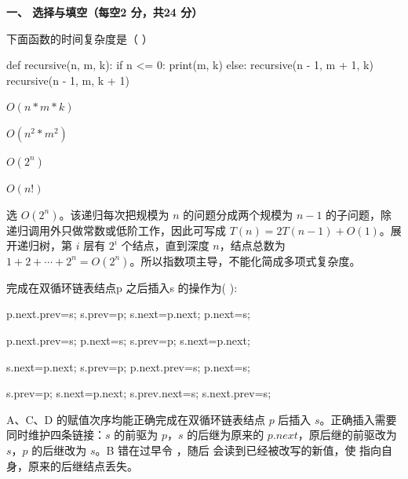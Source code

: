 

\textbf{一、 选择与填空（每空2 分，共24 分）}
\begin{question}
下面函数的时间复杂度是（    ）\\
\begin{pycode}
def recursive(n, m, k):
    if n <= 0:
        print(m, k)
    else:
        recursive(n - 1, m + 1, k)
        recursive(n - 1, m, k + 1)
\end{pycode}
\begin{choiceoptions}[2]
  \item $O(n*m*k)$
  \item $O(n^2*m^2)$
  \item $O(2^n)$
  \item $O(n!)$
\end{choiceoptions}
\begin{solution}
选 $O(2^n)$。该递归每次把规模为 $n$ 的问题分成两个规模为 $n-1$ 的子问题，除递归调用外只做常数或低阶工作，因此可写成 $T(n)=2T(n-1)+O(1)$。展开递归树，第 $i$ 层有 $2^i$ 个结点，直到深度 $n$，结点总数为 $1+2+\cdots+2^n=O(2^n)$。所以指数项主导，不能化简成多项式复杂度。
\end{solution}
\end{question}

\begin{question}
完成在双循环链表结点p 之后插入s 的操作为(       ):\\
\begin{choiceoptions}[2]
  \item p.next.prev=s; s.prev=p; s.next=p.next; p.next=s;
  \item p.next.prev=s; p.next=s; s.prev=p; s.next=p.next;
  \item s.next=p.next; s.prev=p; p.next.prev=s; p.next=s;
  \item s.prev=p; s.next=p.next; s.prev.next=s; s.next.prev=s;
\end{choiceoptions}
\begin{solution}
A、C、D 的赋值次序均能正确完成在双循环链表结点 $p$ 后插入 $s$。正确插入需要同时维护四条链接：$s$ 的前驱为 $p$，$s$ 的后继为原来的 $p.next$，原后继的前驱改为 $s$，$p$ 的后继改为 $s$。B 错在过早令 \texttt{}，随后 \texttt{} 会读到已经被改写的新值，使 \texttt{} 指向自身，原来的后继结点丢失。
\end{solution}
\end{question}

